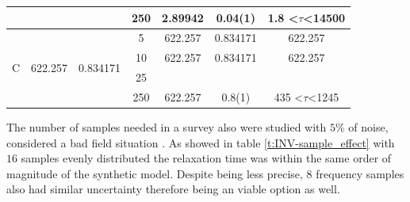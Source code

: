 \documentclass{vie16}
\begin{document}
\begin{table}[H]
\begin{tabular}{@{}|c|c|c|c|c|c|c|@{}}
                   &                          &                            & 250                                                                            & 2.89942         & 0.04(1)           & 1.8 \textless$\tau$\textless 14500  \\ \hline
\multirow{4}{*}{C} & \multirow{4}{*}{622.257} & \multirow{4}{*}{0.834171}  & 5                                                                              & 622.257         & 0.834171          & 622.257                             \\
                   &                          &                            & 10                                                                             & 622.257         & 0.834171          & 622.257                             \\
                   &                          &                            & 25                                                                             &                 &                   &                                     \\
                   &                          &                            & 250                                                                            & 622.257         & 0.8(1)            & 435 \textless $\tau $\textless 1245
\end{tabular}
\end{table}

The number of samples needed in a survey also were studied with $5\%$ of noise, considered a bad %
field situation \citet{sandor11}. As showed in table \ref{t:INV-sample_effect} with $16$ samples evenly distributed the relaxation 
time was within the same order of magnitude of the synthetic model. Despite being less precise, $8$ frequency samples also had similar uncertainty therefore being an viable option as well.
\end{document}
